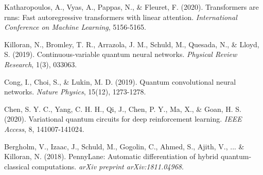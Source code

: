 \documentclass[11pt,twocolumn]{article}
\begin{document}
\begin{thebibliography}{99}
Katharopoulos, A., Vyas, A., Pappas, N., \& Fleuret, F. (2020). Transformers are rnns: Fast autoregressive transformers with linear attention. \textit{International Conference on Machine Learning}, 5156-5165.

Killoran, N., Bromley, T. R., Arrazola, J. M., Schuld, M., Quesada, N., \& Lloyd, S. (2019). Continuous-variable quantum neural networks. \textit{Physical Review Research}, 1(3), 033063.

Cong, I., Choi, S., \& Lukin, M. D. (2019). Quantum convolutional neural networks. \textit{Nature Physics}, 15(12), 1273-1278.

Chen, S. Y. C., Yang, C. H. H., Qi, J., Chen, P. Y., Ma, X., \& Goan, H. S. (2020). Variational quantum circuits for deep reinforcement learning. \textit{IEEE Access}, 8, 141007-141024.

Bergholm, V., Izaac, J., Schuld, M., Gogolin, C., Ahmed, S., Ajith, V., ... \& Killoran, N. (2018). PennyLane: Automatic differentiation of hybrid quantum-classical computations. \textit{arXiv preprint arXiv:1811.04968}.

\end{thebibliography}
\end{document}

